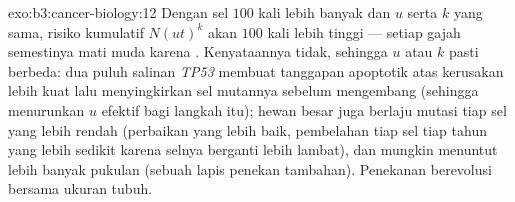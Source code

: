 \begin{solution}{exo:b3:cancer-biology:12}
Dengan sel $100$ kali lebih banyak dan $u$ serta $k$ yang sama, risiko
kumulatif $N(ut)^{k}$ akan $100$ kali lebih tinggi --- setiap gajah semestinya
mati muda karena . Kenyataannya tidak, sehingga $u$ atau $k$ pasti
berbeda: dua puluh salinan \emph{TP53} membuat tanggapan apoptotik atas
kerusakan lebih kuat lalu menyingkirkan sel mutannya sebelum mengembang
(sehingga menurunkan $u$ efektif bagi langkah itu); hewan besar juga berlaju
mutasi tiap sel yang lebih rendah (perbaikan yang lebih baik, pembelahan tiap
sel tiap tahun yang lebih sedikit karena selnya berganti lebih lambat), dan
mungkin menuntut lebih banyak pukulan (sebuah lapis penekan tambahan).
Penekanan  berevolusi bersama ukuran tubuh.
\end{solution}

